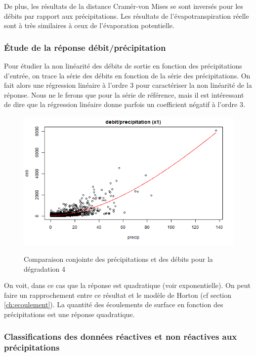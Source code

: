 \documentclass[a4paper,11pt]{article}
\numberwithin{equation}{section}
\begin{document}
De plus, les résultats de la distance Cramér-von Mises se sont inversés pour les débits par rapport aux précipitations. Les résultats de l'évapotranspiration réelle sont à très similaires à ceux de l'évaporation potentielle. 

\subsubsection{Étude de la réponse débit/précipitation}

Pour étudier la non linéarité des débits de sortie en fonction des précipitations d'entrée, on trace la série des débits en fonction de la série des précipitations. On fait alors une régression linéaire à l'ordre 3 pour caractériser la non linéarité de la réponse. Nous ne le ferons que pour la série de référence, mais il est intéressant de dire que la régression linéaire donne parfois un coefficient négatif à l'ordre 3.
  
\begin{figure}[H]
	\begin{center}
		\includegraphics[scale=0.45]{images/deb_rapport_pr_deg1.png}\\
	\end{center}
	\caption{Comparaison conjointe des précipitations et des débits pour la dégradation 4}
\end{figure} 

On voit, dans ce cas que la réponse est quadratique (voir exponentielle). On peut faire un rapprochement entre ce résultat et le modèle de Horton (cf section \ref{ch:ecoulement}). La quantité des écoulements de surface en fonction des précipitations est une réponse quadratique.

\subsubsection{Classifications des données réactives et non réactives aux précipitations}
\label{ch:classification delta deb delta pluie}
\end{document}
